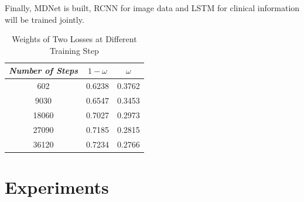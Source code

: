 \documentclass[journal]{IEEEtran}
\begin{document}
Finally, MDNet is built, RCNN for image data and LSTM for clinical information will be trained jointly.

\begin{table}[t]
\vspace{-0cm}
\caption{Weights of Two Losses at Different Training Step}
\vspace{-0cm}
\begin{center}
\begin{tabular}{|c|c|c|}
\hline
\textbf{\textit{Number of Steps}} & \textbf{\textit{$1 - \omega$}} & \textbf{\textit{$\omega$}}\\
\hline
602 &0.6238 & 0.3762  \\
9030 &0.6547 & 0.3453  \\
18060 &0.7027 & 0.2973  \\
27090 &0.7185 & 0.2815  \\
36120 &0.7234 & 0.2766  \\

\hline
\end{tabular}
\vspace{-0cm}
\label{weights}
\end{center}
\vspace{-0cm}
\end{table}


\section{Experiments}
\label{experiments}
\end{document}
